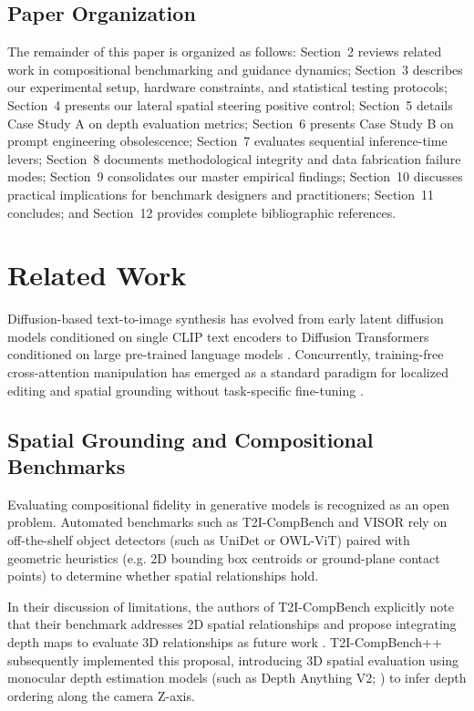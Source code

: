 \documentclass[10pt,twocolumn,letterpaper]{article}
\begin{document}
\subsection*{Paper Organization}
The remainder of this paper is organized as follows: Section~2 reviews related work in compositional benchmarking and guidance dynamics; Section~3 describes our experimental setup, hardware constraints, and statistical testing protocols; Section~4 presents our lateral spatial steering positive control; Section~5 details Case Study A on depth evaluation metrics; Section~6 presents Case Study B on prompt engineering obsolescence; Section~7 evaluates sequential inference-time levers; Section~8 documents methodological integrity and data fabrication failure modes; Section~9 consolidates our master empirical findings; Section~10 discusses practical implications for benchmark designers and practitioners; Section~11 concludes; and Section~12 provides complete bibliographic references.

\section{Related Work}

Diffusion-based text-to-image synthesis has evolved from early latent diffusion models conditioned on single CLIP text encoders \citep{rombach2022high} to Diffusion Transformers \citep{peebles2023scalable} conditioned on large pre-trained language models \citep{chen2024pixart,esser2024scaling}. Concurrently, training-free cross-attention manipulation has emerged as a standard paradigm for localized editing and spatial grounding without task-specific fine-tuning \citep{hertz2022prompt,chefer2023attend}.

\subsection{Spatial Grounding and Compositional Benchmarks}
Evaluating compositional fidelity in generative models is recognized as an open problem. Automated benchmarks such as T2I-CompBench \citep{huang2023t2icompbench} and VISOR \citep{gokhale2022benchmarking} rely on off-the-shelf object detectors (such as UniDet or OWL-ViT) paired with geometric heuristics (e.g. 2D bounding box centroids or ground-plane contact points) to determine whether spatial relationships hold. 

In their discussion of limitations, the authors of T2I-CompBench explicitly note that their benchmark addresses 2D spatial relationships and propose integrating depth maps to evaluate 3D relationships as future work \citep{huang2023t2icompbench}. T2I-CompBench++ \citep{huang2024t2icompbenchplus} subsequently implemented this proposal, introducing 3D spatial evaluation using monocular depth estimation models (such as Depth Anything V2; \citealp{yang2024depth}) to infer depth ordering along the camera Z-axis.
\end{document}
